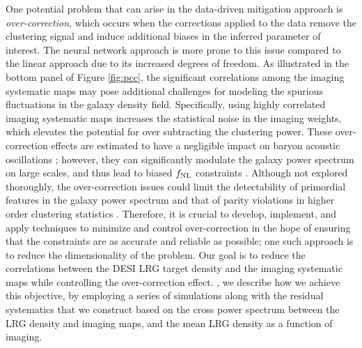  One potential problem that can arise in the data-driven mitigation approach is \textit{over-correction}, which occurs when the corrections applied to the data remove the clustering signal and induce additional biases in the inferred parameter of interest. The neural network approach is more prone to this issue compared to the linear approach due to its increased degrees of freedom. As illustrated in the bottom panel of Figure \ref{fig:pcc}, the significant correlations among the imaging systematic maps may pose additional challenges for modeling the spurious fluctuations in the galaxy density field. Specifically, using highly correlated imaging systematic maps increases the statistical noise in the imaging weights, which elevates the potential for over subtracting the clustering power. These over-correction effects are estimated to have a negligible impact on baryon acoustic oscillations \citep{merz2021clustering}; however, they can significantly modulate the galaxy power spectrum on large scales, and thus lead to biased $f_{\rm NL}$ constraints \citep{rezaie2021primordial, mueller2022primordial}. Although not explored thoroughly, the over-correction issues could limit the detectability of primordial features in the galaxy power spectrum and that of parity violations in higher order clustering statistics \citep{beutler2019primordial, cahn2021test, philcox2022probing}. Therefore, it is crucial to develop, implement, and apply techniques to minimize and control over-correction in the hope of ensuring that the constraints are as accurate and reliable as possible; one such approach is to reduce the dimensionality of the problem. Our goal is to reduce the correlations between the DESI LRG target density and the imaging systematic maps while controlling the over-correction effect. , we describe how we achieve this objective, by employing a series of simulations along with the residual systematics that we construct based on the cross power spectrum between the LRG density and imaging maps, and the mean LRG density as a function of imaging. 
